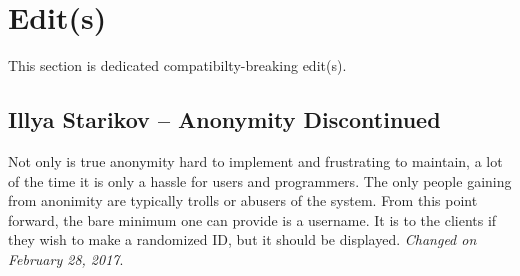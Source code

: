 \documentclass[12pt]{scrartcl}
\begin{document}
\section{Edit(s)}
This section is dedicated compatibilty-breaking edit(s).

\subsection{Illya Starikov -- Anonymity Discontinued}
Not only is true anonymity hard to implement and frustrating to maintain, a lot of the time it is only a hassle for users and programmers. The only people gaining from anonimity are typically trolls or abusers of the system. From this point forward, the bare minimum one can provide is a username. It is to the clients if they wish to make a randomized ID, but it should be displayed. \textit{Changed on February 28, 2017}.
\end{document}
